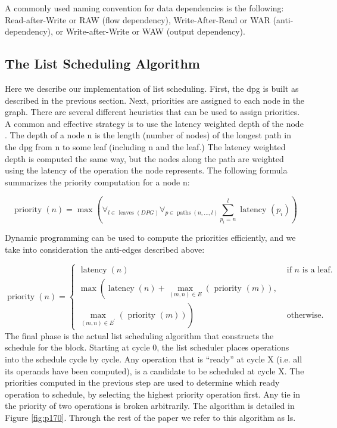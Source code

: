 A commonly used naming convention for data dependencies is the following: Read-after-Write or RAW (flow dependency), Write-After-Read or WAR (anti-dependency), or Write-after-Write or WAW (output dependency).

\subsection{The List Scheduling Algorithm}

Here we describe our implementation of list scheduling. First, the dpg is built as described in the previous
section. Next, priorities are assigned to each node in the graph. There are several different heuristics that
can be used to assign priorities. A common and effective strategy is to use the latency weighted depth of the
node \cite{gibbons1986efficient,landskov1980local}. The depth of a node n is the length (number of nodes) of the longest path in the dpg from n to
some leaf (including n and the leaf.) The latency weighted depth is computed the same way, but the nodes
along the path are weighted using the latency of the operation the node represents. The following formula
summarizes the priority computation for a node n:

$$
\operatorname{priority}(n)=\max \left(\forall_{l \in \text { leaves }(D P G)} \forall_{p \in \operatorname{paths}(n, \ldots, l)} \sum_{p_i=n}^l \text { latency }\left(p_i\right)\right)
$$

Dynamic programming can be used to compute the priorities efficiently, and we take into consideration
the anti-edges described above:

$$
\operatorname{priority}(n)=\left\{\begin{array}{cc}
\operatorname{latency}(n) & \text { if } n \text { is a leaf. } \\
\max \left(\operatorname{latency}(n)+\max _{(m, n) \in E}(\text { priority }(m)),\right. & \\
\left.\max _{(m, n) \in E^{\prime}}(\text { priority }(m))\right) & \text { otherwise. }
\end{array}\right.
$$
The final phase is the actual list scheduling algorithm that constructs the schedule for the block. Starting
at cycle 0, the list scheduler places operations into the schedule cycle by cycle. Any operation that is “ready”
at cycle X (i.e. all its operands have been computed), is a candidate to be scheduled at cycle X. The priorities
computed in the previous step are used to determine which ready operation to schedule, by selecting the
highest priority operation first. Any tie in the priority of two operations is broken arbitrarily. The algorithm
is detailed in Figure \ref{fig:p170}. Through the rest of the paper we refer to this algorithm as ls.



